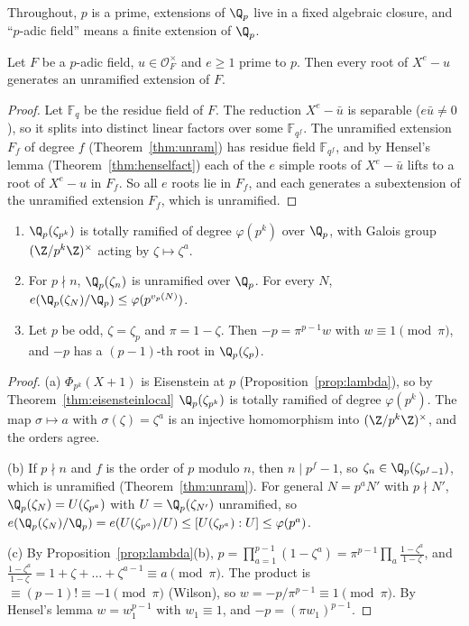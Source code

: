 Throughout, $p$ is a prime, extensions of $\Q_p$ live in a fixed algebraic closure, and ``$p$-adic field'' means a finite extension of
$\Q_p$.

\begin{lemma}\label{lem:unramroot}
Let $F$ be a $p$-adic field, $u\in\mathcal O_F^\times$ and $e\ge1$ prime to $p$. Then every root of $X^e-u$ generates an unramified
extension of $F$.
\end{lemma}
\begin{proof}
Let $\mathbb F_q$ be the residue field of $F$. The reduction $X^e-\bar u$ is separable ($e\bar u\ne0$), so it splits into distinct linear
factors over some $\mathbb F_{q^f}$. The unramified extension $F_f$ of degree $f$ (Theorem~\ref{thm:unram}) has residue field $\mathbb F_{q^f}$, and by
Hensel's lemma (Theorem~\ref{thm:henselfact}) each of the $e$ simple roots of $X^e-\bar u$ lifts to a root of $X^e-u$ in $F_f$. So all $e$
roots lie in $F_f$, and each generates a subextension of the unramified extension $F_f$, which is unramified.
\end{proof}

\begin{lemma}\label{lem:localcyclo}
\begin{enumerate}[label=(\alph*)]
\item $\Q_p(\zeta_{p^k})$ is totally ramified of degree $\varphi(p^k)$ over $\Q_p$, with Galois group $(\Z/p^k\Z)^\times$ acting by
$\zeta\mapsto\zeta^a$.
\item For $p\nmid n$, $\Q_p(\zeta_n)$ is unramified over $\Q_p$. For every $N$, $e(\Q_p(\zeta_N)/\Q_p)\le\varphi(p^{v_p(N)})$.
\item Let $p$ be odd, $\zeta=\zeta_p$ and $\pi=1-\zeta$. Then $-p=\pi^{p-1}w$ with $w\equiv1\pmod\pi$, and $-p$ has a $(p-1)$-th root in
$\Q_p(\zeta_p)$.
\end{enumerate}
\end{lemma}
\begin{proof}
(a) $\Phi_{p^k}(X+1)$ is Eisenstein at $p$ (Proposition~\ref{prop:lambda}), so by Theorem~\ref{thm:eisensteinlocal} $\Q_p(\zeta_{p^k})$ is
totally ramified of degree $\varphi(p^k)$. The map $\sigma\mapsto a$ with $\sigma(\zeta)=\zeta^a$ is an injective homomorphism into
$(\Z/p^k\Z)^\times$, and the orders agree.

(b) If $p\nmid n$ and $f$ is the order of $p$ modulo $n$, then $n\mid p^f-1$, so $\zeta_n\in\Q_p(\zeta_{p^f-1})$, which is unramified
(Theorem~\ref{thm:unram}). For general $N=p^aN'$ with $p\nmid N'$, $\Q_p(\zeta_N)=U(\zeta_{p^a})$ with $U=\Q_p(\zeta_{N'})$ unramified, so
$e(\Q_p(\zeta_N)/\Q_p)=e(U(\zeta_{p^a})/U)\le[U(\zeta_{p^a}):U]\le\varphi(p^a)$.

(c) By Proposition~\ref{prop:lambda}(b), $p=\prod_{a=1}^{p-1}(1-\zeta^a)=\pi^{p-1}\prod_a\frac{1-\zeta^a}{1-\zeta}$, and
$\frac{1-\zeta^a}{1-\zeta}=1+\zeta+\dots+\zeta^{a-1}\equiv a\pmod\pi$. The product is $\equiv(p-1)!\equiv-1\pmod\pi$ (Wilson), so
$w=-p/\pi^{p-1}\equiv1\pmod\pi$. By Hensel's lemma $w=w_1^{p-1}$ with $w_1\equiv1$, and $-p=(\pi w_1)^{p-1}$.
\end{proof}

